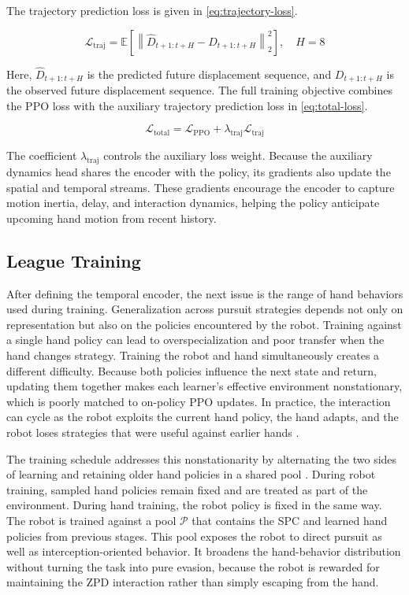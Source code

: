 \documentclass[lettersize,journal]{IEEEtran}
\begin{document}
The trajectory prediction loss is given in \eqref{eq:trajectory-loss}.

\begin{equation}
\mathcal{L}_{\mathrm{traj}}
= \mathbb{E}\!\left[
\left\|\widehat{D}_{t+1:t+H}-D_{t+1:t+H}\right\|_2^2
\right], \quad H=8
\label{eq:trajectory-loss}
\end{equation}

Here, $\widehat{D}_{t+1:t+H}$ is the predicted future displacement sequence, and $D_{t+1:t+H}$ is the observed future displacement sequence. The full training objective combines the PPO loss with the auxiliary trajectory prediction loss in \eqref{eq:total-loss}.

\begin{equation}
\mathcal{L}_{\mathrm{total}} = \mathcal{L}_{\mathrm{PPO}} + \lambda_{\mathrm{traj}}\mathcal{L}_{\mathrm{traj}}
\label{eq:total-loss}
\end{equation}

The coefficient $\lambda_{\mathrm{traj}}$ controls the auxiliary loss weight. Because the auxiliary dynamics head shares the encoder with the policy, its gradients also update the spatial and temporal streams. These gradients encourage the encoder to capture motion inertia, delay, and interaction dynamics, helping the policy anticipate upcoming hand motion from recent history.

\subsection{League Training}
\label{subsec:league-training}
After defining the temporal encoder, the next issue is the range of hand behaviors used during training. Generalization across pursuit strategies depends not only on representation but also on the policies encountered by the robot. Training against a single hand policy can lead to overspecialization and poor transfer when the hand changes strategy. Training the robot and hand simultaneously creates a different difficulty. Because both policies influence the next state and return, updating them together makes each learner's effective environment nonstationary, which is poorly matched to on-policy PPO updates. In practice, the interaction can cycle as the robot exploits the current hand policy, the hand adapts, and the robot loses strategies that were useful against earlier hands \cite{lanctotUnifiedMARL2017}.

The training schedule addresses this nonstationarity by alternating the two sides of learning and retaining older hand policies in a shared pool \cite{vinyalsAlphaStar2019,jaderbergPopulationGames2019}. During robot training, sampled hand policies remain fixed and are treated as part of the environment. During hand training, the robot policy is fixed in the same way. The robot is trained against a pool $\mathcal{P}$ that contains the SPC and learned hand policies from previous stages. This pool exposes the robot to direct pursuit as well as interception-oriented behavior. It broadens the hand-behavior distribution without turning the task into pure evasion, because the robot is rewarded for maintaining the ZPD interaction rather than simply escaping from the hand.
\end{document}
